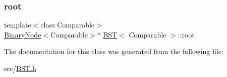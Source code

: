 \mbox{\label{classBST_a48d08a19c48c0c260a7d5db37149ad0f}} 
\subsubsection{\texorpdfstring{root}{root}}
{\footnotesize\ttfamily template$<$class Comparable$>$ \\
\hyperlink{classBinaryNode}{Binary\+Node}$<$Comparable$>$$\ast$ \hyperlink{classBST}{B\+ST}$<$ Comparable $>$\+::root\hspace{0.3cm}{\ttfamily [private]}}



The documentation for this class was generated from the following file\+:\begin{DoxyCompactItemize}
\item 
src/\hyperlink{BST_8h}{B\+S\+T.\+h}\end{DoxyCompactItemize}
